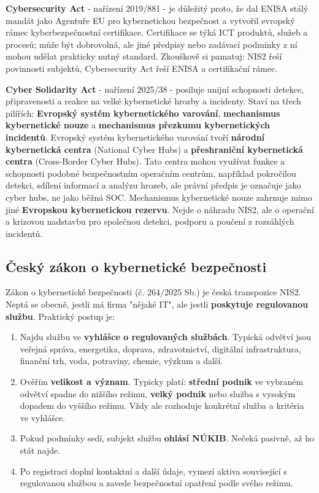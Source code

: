 \documentclass[11pt,a4paper]{article}
\begin{document}
\textbf{Cybersecurity Act} - nařízení 2019/881 - je důležitý proto, že dal ENISA stálý mandát jako Agentuře EU pro kybernetickou bezpečnost a vytvořil evropský rámec kyberbezpečnostní certifikace. Certifikace se týká ICT produktů, služeb a procesů; může být dobrovolná, ale jiné předpisy nebo zadávací podmínky z ní mohou udělat prakticky nutný standard. Zkouškově si pamatuj: NIS2 řeší povinnosti subjektů, Cybersecurity Act řeší ENISA a certifikační rámec.

\textbf{Cyber Solidarity Act} - nařízení 2025/38 - posiluje unijní schopnosti detekce, připravenosti a reakce na velké kybernetické hrozby a incidenty. Staví na třech pilířích: \textbf{Evropský systém kybernetického varování}, \textbf{mechanismus kybernetické nouze} a \textbf{mechanismus přezkumu kybernetických incidentů}. Evropský systém kybernetického varování tvoří \textbf{národní kybernetická centra} (National Cyber Hubs) a \textbf{přeshraniční kybernetická centra} (Cross-Border Cyber Hubs). Tato centra mohou využívat funkce a schopnosti podobné bezpečnostním operačním centrům, například pokročilou detekci, sdílení informací a analýzu hrozeb, ale právní předpis je označuje jako cyber hubs, ne jako běžná SOC. Mechanismus kybernetické nouze zahrnuje mimo jiné \textbf{Evropskou kybernetickou rezervu}. Nejde o náhradu NIS2, ale o operační a krizovou nadstavbu pro společnou detekci, podporu a poučení z rozsáhlých incidentů.

\subsection*{Český zákon o kybernetické bezpečnosti}
Zákon o kybernetické bezpečnosti (č. 264/2025 Sb.) je česká transpozice NIS2. Neptá se obecně, jestli má firma "nějaké IT", ale jestli \textbf{poskytuje regulovanou službu}. Praktický postup je:
\begin{enumerate}
  \item Najdu službu ve \textbf{vyhlášce o regulovaných službách}. Typická odvětví jsou veřejná správa, energetika, doprava, zdravotnictví, digitální infrastruktura, finanční trh, voda, potraviny, chemie, výzkum a další.
  \item Ověřím \textbf{velikost a význam}. Typicky platí: \textbf{střední podnik} ve vybraném odvětví spadne do nižšího režimu, \textbf{velký podnik} nebo služba s vysokým dopadem do vyššího režimu. Vždy ale rozhoduje konkrétní služba a kritéria ve vyhlášce.
  \item Pokud podmínky sedí, subjekt službu \textbf{ohlásí NÚKIB}. Nečeká pasivně, až ho stát najde.
  \item Po registraci doplní kontaktní a další údaje, vymezí aktiva související s regulovanou službou a zavede bezpečnostní opatření podle svého režimu.
\end{enumerate}
\end{document}
